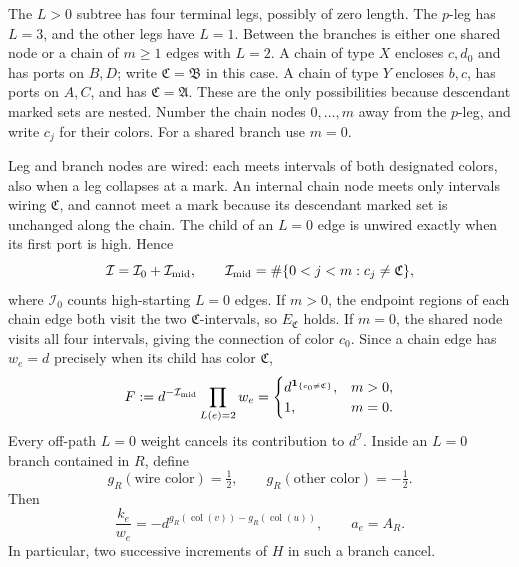 The $L>0$ subtree has four terminal legs, possibly of zero length.
The $p$-leg has $L=3$, and the other legs have $L=1$.  Between the
branches is either one shared node or a chain of $m\ge1$ edges with
$L=2$.  A chain of type $X$ encloses $c,d_0$ and has ports on $B,D$;
write $\mathfrak C=\mathfrak B$ in this case.  A chain of type $Y$
encloses $b,c$, has ports on $A,C$, and has $\mathfrak C=\mathfrak A$.
These are the only possibilities because descendant marked sets are
nested.  Number the chain nodes $0,\ldots,m$ away from the $p$-leg,
and write $c_j$ for their colors.  For a shared branch use $m=0$.

Leg and branch nodes are wired: each meets intervals of both designated
colors, also when a leg collapses at a mark.  An internal chain node
meets only intervals wiring $\mathfrak C$, and cannot meet a mark because
its descendant marked set is unchanged along the chain.  The child of
an $L=0$ edge is unwired exactly when its first port is high.  Hence
\begin{equation}
 \mathcal I=\mathcal I_0+\mathcal I_{\rm mid},\qquad
 \mathcal I_{\rm mid}=\#\{0<j<m:c_j\ne\mathfrak C\},
 \label{four:count-split}
\end{equation}
where $\mathcal I_0$ counts high-starting $L=0$ edges.  If $m>0$,
the endpoint regions of each chain edge both visit the two
$\mathfrak C$-intervals, so $E_{\mathfrak C}$ holds.  If $m=0$,
the shared node visits all four intervals, giving the connection of
color $c_0$.  Since a chain edge has $w_e=d$ precisely when its child
has color $\mathfrak C$,
\begin{equation}
 F:=d^{-\mathcal I_{\rm mid}}\prod_{L(e)=2}w_e
 =\begin{cases}
 d^{\mathbf1_{\{c_0\ne\mathfrak C\}}},&m>0,\\
 1,&m=0.
 \end{cases}
 \label{four:F}
\end{equation}
Every off-path $L=0$ weight cancels its contribution to $d^{\mathcal I}$.
Inside an $L=0$ branch contained in $R$, define
\begin{equation}
 g_R(\text{wire color})=\tfrac12,\qquad
 g_R(\text{other color})=-\tfrac12.
 \label{four:g}
\end{equation}
Then
\begin{equation}
 \frac{k_e}{w_e}
 =-d^{g_R(\operatorname{col}(v))-g_R(\operatorname{col}(u))},
 \qquad a_e=A_R.
 \label{four:tail}
\end{equation}
In particular, two successive increments of $H$ in such a branch cancel.

